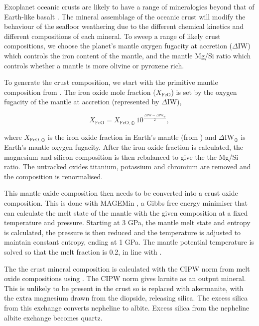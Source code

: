 \documentclass[fleqn,usenatbib]{mnras}
\begin{document}
Exoplanet oceanic crusts are likely to have a range of mineralogies beyond that of Earth-like basalt \citep{guimond_stars_2024}. The mineral assemblage of the oceanic crust will modify the behaviour of the seafloor weathering due to the different chemical kinetics and different compositions of each mineral. To sweep a range of likely crust compositions, we choose the planet's mantle oxygen fugacity at accretion ($\Delta \mathrm{IW}$) which controls the iron content of the mantle, and the mantle Mg/Si ratio which controls whether a mantle is more olivine or pyroxene rich.  

To generate the crust composition, we start with the primitive mantle composition from \cite{mcdonough_composition_1995}. The iron oxide mole fraction ($X_{\mathrm{FeO}}$) is set by the oxygen fugacity of the mantle at accretion (represented by $\Delta \mathrm{IW}$),

\begin{equation}
    X_{\mathrm{FeO}} = X_{\mathrm{FeO},\oplus} \,10^{\frac{\Delta\mathrm{IW} - \Delta\mathrm{IW}_{\oplus}}{2}}, 
\end{equation}

where $X_{\mathrm{FeO},\oplus}$ is the iron oxide fraction in Earth's mantle (from \cite{mcdonough_composition_1995}) and $\Delta\mathrm{IW}_{\oplus}$ is Earth's mantle oxygen fugacity. After the iron oxide fraction is calculated, the magnesium and silicon composition is then rebalanced to give the the Mg/Si ratio. The untracked oxides titanium, potassium and chromium are removed and the composition is renormalised.

This mantle oxide composition then needs to be converted into a crust oxide composition. This is done with MAGEMin \citep{riel_magemin_2022}, a Gibbs free energy minimiser that can calculate the melt state of the mantle with the given composition at a fixed temperature and pressure. Starting at 3 GPa, the mantle melt state and entropy is calculated, the pressure is then reduced and the temperature is adjusted to maintain constant entropy, ending at 1 GPa. The mantle potential temperature is solved so that the melt fraction is 0.2, in line with \cite{guimond_stars_2024}.

The the crust mineral composition is calculated with the CIPW norm from melt oxide compositions using \cite{williams_pyrolite_2020}. The CIPW norm gives larnite as an output mineral. This is unlikely to be present in the crust so is replaced with akermanite, with the extra magnesium drawn from the diopside, releasing silica. The excess silica from this exchange converts nepheline to albite. Excess silica from the nepheline albite exchange becomes quartz.
\end{document}
